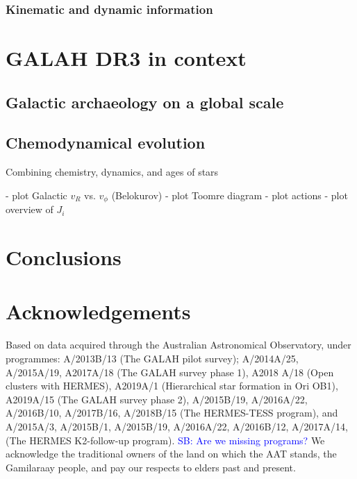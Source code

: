 \documentclass[fleqn,usenatbib,useAMS]{mnras}
\newcommand\SB[1]{\textcolor{blue}{SB: #1}}
\begin{document}
\subsubsection{Kinematic and dynamic information}

\section{GALAH DR3 in context} \label{sec:galah_in_context}

\subsection{Galactic archaeology on a global scale}  \label{sec:global_ga}

\subsection{Chemodynamical evolution}  \label{sec:cde}

Combining chemistry, dynamics, and ages of stars

- plot Galactic $v_R$ vs. $v_\phi$ (Belokurov)
- plot Toomre diagram
- plot actions
- plot \cite{Vasiliev2019} overview of $J_i$

\section{Conclusions} \label{sec:conclusions}


\section*{Acknowledgements}

Based on data acquired through the Australian Astronomical Observatory, under programmes: A/2013B/13 (The GALAH pilot survey); A/2014A/25, A/2015A/19, A2017A/18 (The GALAH survey phase 1), A2018 A/18 (Open clusters with HERMES), A2019A/1 (Hierarchical star formation in Ori OB1),  A2019A/15 (The GALAH survey phase 2), A/2015B/19, A/2016A/22, A/2016B/10, A/2017B/16, A/2018B/15 (The HERMES-TESS program), and A/2015A/3, A/2015B/1, A/2015B/19, A/2016A/22, A/2016B/12, A/2017A/14, (The HERMES K2-follow-up program). \SB{Are we missing programs?} We acknowledge the traditional owners of the land on which the AAT stands, the Gamilaraay people, and pay our respects to elders past and present.
\end{document}
